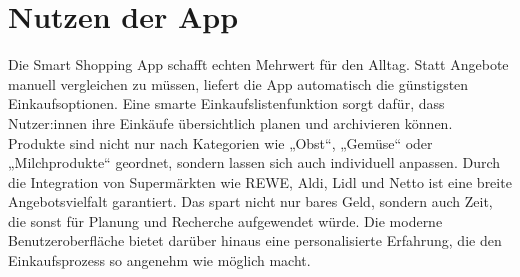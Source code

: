 \section{Nutzen der App}
Die Smart Shopping App schafft echten Mehrwert für den Alltag. Statt Angebote manuell vergleichen zu müssen, liefert die App automatisch die günstigsten Einkaufsoptionen. Eine smarte Einkaufslistenfunktion sorgt dafür, dass Nutzer:innen ihre Einkäufe übersichtlich planen und archivieren können. Produkte sind nicht nur nach Kategorien wie „Obst“, „Gemüse“ oder „Milchprodukte“ geordnet, sondern lassen sich auch individuell anpassen. Durch die Integration von Supermärkten wie REWE, Aldi, Lidl und Netto ist eine breite Angebotsvielfalt garantiert. Das spart nicht nur bares Geld, sondern auch Zeit, die sonst für Planung und Recherche aufgewendet würde. Die moderne Benutzeroberfläche bietet darüber hinaus eine personalisierte Erfahrung, die den Einkaufsprozess so angenehm wie möglich macht.
